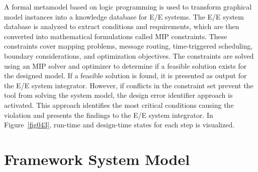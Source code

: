 A formal metamodel based on logic programming is used to transform graphical model instances into a knowledge database for E/E systems. The E/E system database is analyzed to extract conditions and requirements, which are then converted into mathematical formulations called MIP constraints. These constraints cover mapping problems, message routing, time-triggered scheduling, boundary considerations, and optimization objectives. The constraints are solved using an MIP solver and optimizer to determine if a feasible solution exists for the designed model. If a feasible solution is found, it is presented as output for the E/E system integrator. However, if conflicts in the constraint set prevent the tool from solving the system model, the design error identifier approach is activated. This approach identifies the most critical conditions causing the violation and presents the findings to the E/E system integrator. In Figure~\ref{fig043}, run-time and design-time states for each step is visualized.



\section{Framework System Model}



